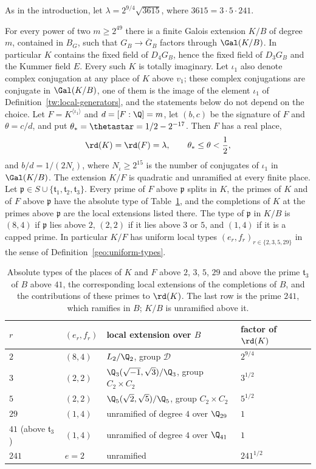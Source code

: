 As in the introduction, let $\lambda=2^{9/4}\sqrt{3615}$, where
$3615=3\cdot5\cdot241$.

\begin{theorem}\label{tw:field-family}
For every power of two $m\ge2^{49}$ there is a finite Galois extension
$K/B$ of degree $m$, contained in $B_G$, such that $G_B\to\overline G_B$
factors through $\Gal(K/B)$. In particular $K$ contains the fixed field of
$D_4G_B$, hence the fixed field of $D_3G_B$ and the Kummer field $E$. Every
such $K$ is totally imaginary. Let $\iota_1$ also denote complex
conjugation at any place of $K$ above $v_1$; these complex conjugations are
conjugate in $\Gal(K/B)$, one of them is the image of the element $\iota_1$
of Definition~\ref{tw:local-generators}, and the statements below do not
depend on the choice. Let $F=K^{\langle\iota_1\rangle}$ and
$d=[F:\Q]=m$, let $(b,c)$ be the signature of $F$ and $\theta=c/d$, and put
$\theta_*=\thetastar=1/2-2^{-17}$. Then $F$ has a real place,
\[
 \rd(K)=\rd(F)=\lambda,\qquad \theta_*\le\theta<\frac12 ,
\]
and $b/d=1/(2N_\iota)$, where $N_\iota\ge2^{15}$ is the number of conjugates
of $\iota_1$ in $\Gal(K/B)$. The extension $K/F$ is quadratic and unramified
at every finite place. Let $\mathfrak p\in S\cup\{\mathfrak t_1,\mathfrak
t_2,\mathfrak t_3\}$. Every prime of $F$ above $\mathfrak p$ splits in $K$, the
primes of $K$ and of $F$ above $\mathfrak p$ have the absolute type of
Table~\ref{tw:types-table}, and the completions of $K$ at the primes above
$\mathfrak p$ are the local extensions listed there. The type of $\mathfrak p$
in $K/B$ is $(8,4)$ if $\mathfrak p$ lies above $2$, $(2,2)$ if it lies above
$3$ or $5$, and $(1,4)$ if it is a capped prime. In particular $K/F$ has
uniform local types $(e_r,f_r)_{r\in\{2,3,5,29\}}$ in the sense of
Definition~\ref{geo:uniform-types}.
\end{theorem}

\begin{table}[htbp]
\centering
\caption{Absolute types of the places of $K$ and $F$ above $2$, $3$, $5$,
$29$ and above the prime $\mathfrak t_3$ of $B$ above $41$, the corresponding
local extensions of the completions of $B$, and the contributions of these
primes to $\rd(K)$. The last row is the prime $241$, which ramifies in $B$;
$K/B$ is unramified above it.}
\label{tw:types-table}
\begin{tabular}{llll}
\toprule
$r$ & $(e_r,f_r)$ & local extension over $B$ & factor of $\rd(K)$\\
\midrule
$2$ & $(8,4)$ & $L_2/\Q_2$, group $\mathcal D$ & $2^{9/4}$\\
$3$ & $(2,2)$ & $\Q_3(\sqrt{-1},\sqrt3)/\Q_3$, group $C_2\times C_2$ & $3^{1/2}$\\
$5$ & $(2,2)$ & $\Q_5(\sqrt2,\sqrt5)/\Q_5$, group $C_2\times C_2$ & $5^{1/2}$\\
$29$ & $(1,4)$ & unramified of degree $4$ over $\Q_{29}$ & $1$\\
$41$ (above $\mathfrak t_3$) & $(1,4)$ & unramified of degree $4$ over $\Q_{41}$ & $1$\\
\midrule
$241$ & $e=2$ & unramified & $241^{1/2}$\\
\bottomrule
\end{tabular}
\end{table}

